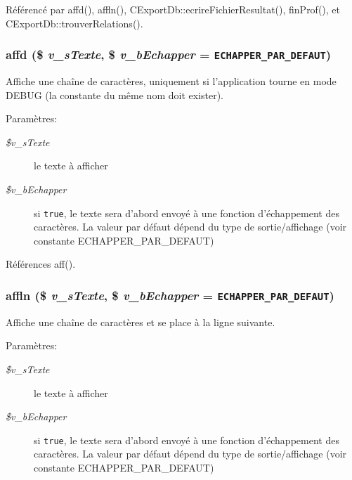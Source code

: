 Référencé par affd(), affln(), CExportDb::ecrireFichierResultat(), finProf(), et CExportDb::trouverRelations().
\subsubsection{\setlength{\rightskip}{0pt plus 5cm}affd (\$ {\em v\_\-sTexte}, \/  \$ {\em v\_\-bEchapper} = {\tt ECHAPPER\_\-PAR\_\-DEFAUT})}\label{export_8php_7bc2aa80b7ba359091f30e86d19ea846}


Affiche une chaîne de caractères, uniquement si l'application tourne en mode DEBUG (la constante du même nom doit exister). 

\begin{Desc}
\item[Paramètres:]
\begin{description}
\item[{\em \$v\_\-sTexte}]le texte à afficher \item[{\em \$v\_\-bEchapper}]si {\tt true}, le texte sera d'abord envoyé à une fonction d'échappement des caractères. La valeur par défaut dépend du type de sortie/affichage (voir constante ECHAPPER\_\-PAR\_\-DEFAUT) \end{description}
\end{Desc}


Références aff().
\subsubsection{\setlength{\rightskip}{0pt plus 5cm}affln (\$ {\em v\_\-sTexte}, \/  \$ {\em v\_\-bEchapper} = {\tt ECHAPPER\_\-PAR\_\-DEFAUT})}\label{export_8php_6e87d59cc52c9aca7c69ce91c37746fd}


Affiche une chaîne de caractères et se place à la ligne suivante. 

\begin{Desc}
\item[Paramètres:]
\begin{description}
\item[{\em \$v\_\-sTexte}]le texte à afficher \item[{\em \$v\_\-bEchapper}]si {\tt true}, le texte sera d'abord envoyé à une fonction d'échappement des caractères. La valeur par défaut dépend du type de sortie/affichage (voir constante ECHAPPER\_\-PAR\_\-DEFAUT) \end{description}
\end{Desc}


